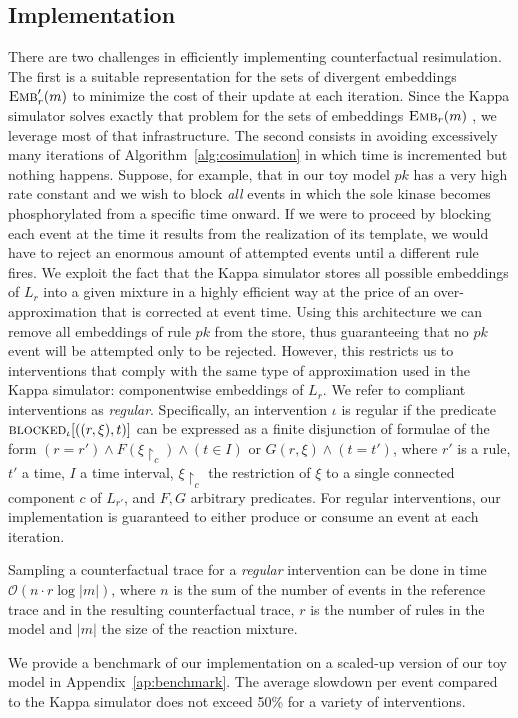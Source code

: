 
\subsection{Implementation}\label{subsec:implementation}

There are two challenges in efficiently implementing counterfactual
resimulation. The first is a suitable representation for the sets of
divergent embeddings ${\textsc{Emb}}'_{r}(m)$ to minimize the cost of their
update at each iteration. Since the Kappa simulator solves exactly
that problem for the sets of embeddings ${\textsc{Emb}}_{r}(m)$
\cite{DanosEtAl-APLAS07}, we leverage most of that infrastructure. The
second consists in avoiding excessively many iterations of
Algorithm~\ref{alg:cosimulation} in which time is incremented but
nothing happens. Suppose, for example, that in our toy model $pk$ has
a very high rate constant and we wish to block \emph{all} events in
which the sole kinase becomes phosphorylated from a specific time
onward. If we were to proceed by blocking each event at the time it
results from the realization of its template, we would have to reject
an enormous amount of attempted events until a different rule
fires. We exploit the fact that the Kappa simulator stores all
possible embeddings of $L_r$ into a given mixture in a highly
efficient way at the price of an over-approximation that is corrected
at event time. Using this architecture we can remove all embeddings of
rule $pk$ from the store, thus guaranteeing that no $pk$ event will be
attempted only to be rejected. However, this restricts us to
interventions that comply with the same type of approximation used in
the Kappa simulator: componentwise embeddings of $L_{r}$. We refer to
compliant interventions as \emph{regular}.  Specifically, an
intervention $\iota$ is regular if the predicate
${\textsc{blocked}}_{\iota}[((r, \xi), t)]$ can be expressed as a finite
disjunction of formulae of the form
$(r = r') \wedge F(\xi{\restriction_{c}}) \wedge (t \in I)$ or
$G(r, \xi) \wedge (t = t')$, where $r'$ is a rule, $t'$ a time, $I$ a
time interval, $\xi{\restriction_{c}}$ the restriction of $\xi$ to a
single connected component $c$ of $L_{r'}$, and $F, G$ arbitrary
predicates. For regular interventions, our implementation is
guaranteed to either produce or consume an event at each iteration.

\begin{proposition}
  Sampling a counterfactual trace for a \emph{regular} intervention
  can be done in time $\mathcal{O}(n \cdot r \log|m|)$, where $n$ is
  the sum of the number of events in the reference trace and in the
  resulting counterfactual trace, $r$ is the number of rules in the
  model and $|m|$ the size of the reaction mixture.
\end{proposition}

We provide a benchmark of our implementation on a scaled-up version of
our toy model in Appendix~\ref{ap:benchmark}. The average slowdown per
event compared to the Kappa simulator does not exceed 50\% for a
variety of interventions.
